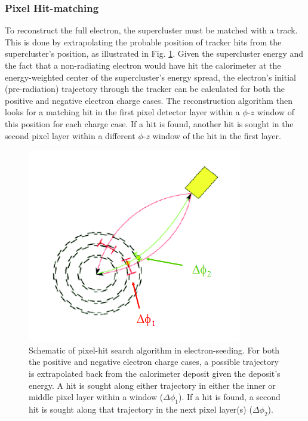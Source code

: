 
\subsubsection{Pixel Hit-matching}
\label{evReco:pixMatch}

To reconstruct the full electron, 
the supercluster must be matched with a track.  
This is done by extrapolating the probable position of 
tracker hits from the supercluster's position, 
as illustrated in Fig. \ref{fig:PixMatch}.  
Given the supercluster energy and the fact that a 
non-radiating electron would have hit the calorimeter 
at the energy-weighted center of the supercluster's 
energy spread, 
the electron's initial (pre-radiation) trajectory 
through the tracker can be calculated 
for both the positive and negative electron 
charge cases.  
The reconstruction algorithm then looks for a matching 
hit in the first pixel detector layer 
within a $\phi$-$z$ window of this position 
for each charge case.  
If a hit is found, another hit is sought in the second 
pixel layer within a different $\phi$-$z$ window 
of the hit in the first layer.  


 \begin{figure}[htb]
  \begin{center}
    \includegraphics{Figures/elec-pixmatch.png}
  \end{center}
  \caption[Schematic of pixel-hit search algorithm in electron-seeding]{Schematic of pixel-hit search algorithm in electron-seeding. For both the positive and negative electron charge cases, a possible trajectory is extrapolated back from the calorimeter deposit given the deposit's energy. A hit is sought along either trajectory in either the inner or middle pixel layer within a window ($\Delta\phi_1$). If a hit is found, a second hit is sought along that trajectory in the next pixel layer(s) ($\Delta\phi_2$).}
  \label{fig:PixMatch}
 \end{figure}

